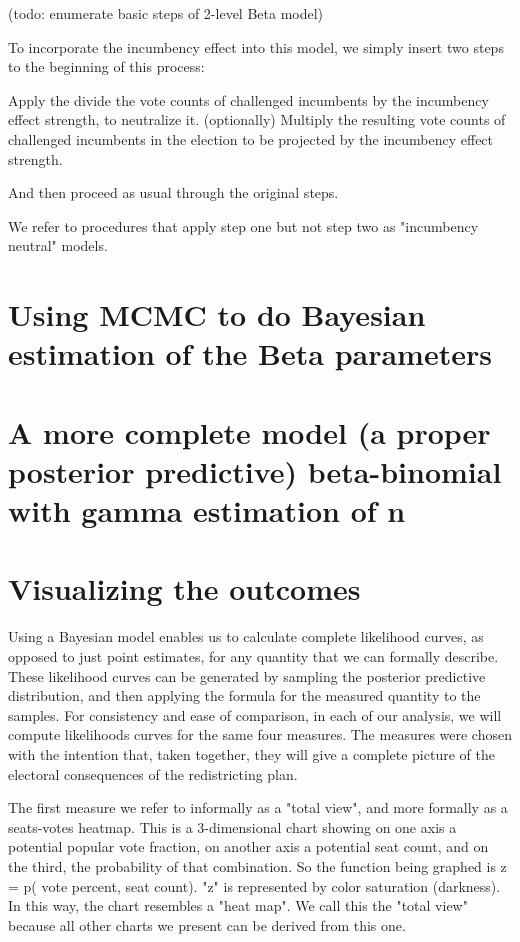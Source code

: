 \documentclass[preprint,12pt]{article}
\begin{document}
(todo: enumerate basic steps of 2-level Beta model)

To incorporate the incumbency effect into this model, we simply insert two steps to the beginning of this process:

Apply the divide the vote counts of challenged incumbents by the incumbency effect strength, to neutralize it.
(optionally) Multiply the resulting vote counts of challenged incumbents in the election to be projected by the incumbency effect strength.

And then proceed as usual through the original steps. 

We refer to procedures that apply step one but not step two as "incumbency neutral" models.

\section{Using MCMC to do Bayesian estimation of the Beta parameters}

\section{A more complete model (a proper posterior predictive) beta-binomial with gamma estimation of n}

\section{Visualizing the outcomes}

Using a Bayesian model enables us to calculate complete likelihood curves, as opposed to just point estimates, for any quantity that we can formally describe.  These likelihood curves can be generated by sampling the posterior predictive distribution, and then applying the formula for the measured quantity to the samples.  For consistency and ease of comparison, in each of our analysis, we will compute likelihoods curves for the same four measures.  The measures were chosen with the intention that, taken together, they will give a complete picture of the electoral consequences of the redistricting plan.



The first measure we refer to informally as a "total view", and more formally as a seats-votes heatmap. This is a 3-dimensional chart showing on one axis a potential popular vote fraction, on another axis a potential seat count, and on the third, the probability of that combination.  So the function being graphed is z = p( vote percent, seat count). "z" is represented by color saturation (darkness).  In this way, the chart resembles a "heat map". We call this the "total view" because all other charts we present can be derived from this one.
\end{document}
